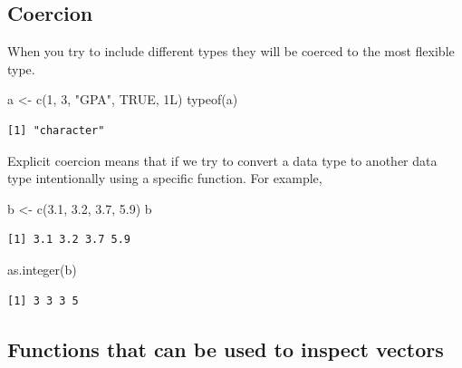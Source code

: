 \documentclass[
  letterpaper,
  DIV=11,
  numbers=noendperiod]{scrreprt}
\newenvironment{Shaded}{\begin{snugshade}}{\end{snugshade}}
\newcommand{\ConstantTok}[1]{\textcolor[rgb]{0.56,0.35,0.01}{#1}}
\newcommand{\DecValTok}[1]{\textcolor[rgb]{0.68,0.00,0.00}{#1}}
\newcommand{\FloatTok}[1]{\textcolor[rgb]{0.68,0.00,0.00}{#1}}
\newcommand{\FunctionTok}[1]{\textcolor[rgb]{0.28,0.35,0.67}{#1}}
\newcommand{\NormalTok}[1]{\textcolor[rgb]{0.00,0.23,0.31}{#1}}
\newcommand{\OtherTok}[1]{\textcolor[rgb]{0.00,0.23,0.31}{#1}}
\newcommand{\StringTok}[1]{\textcolor[rgb]{0.13,0.47,0.30}{#1}}
\begin{document}
\subsection{Coercion}\label{coercion}

When you try to include different types they will be coerced to the most
flexible type.

\begin{Shaded}
\begin{Highlighting}[]
\NormalTok{a }\OtherTok{\textless{}{-}} \FunctionTok{c}\NormalTok{(}\DecValTok{1}\NormalTok{, }\DecValTok{3}\NormalTok{, }\StringTok{"GPA"}\NormalTok{, }\ConstantTok{TRUE}\NormalTok{, }\DecValTok{1}\NormalTok{L)}
\FunctionTok{typeof}\NormalTok{(a)}
\end{Highlighting}
\end{Shaded}

\begin{verbatim}
[1] "character"
\end{verbatim}

Explicit coercion means that if we try to convert a data type to another
data type intentionally using a specific function. For example,

\begin{Shaded}
\begin{Highlighting}[]
\NormalTok{b }\OtherTok{\textless{}{-}} \FunctionTok{c}\NormalTok{(}\FloatTok{3.1}\NormalTok{, }\FloatTok{3.2}\NormalTok{, }\FloatTok{3.7}\NormalTok{, }\FloatTok{5.9}\NormalTok{)}
\NormalTok{b}
\end{Highlighting}
\end{Shaded}

\begin{verbatim}
[1] 3.1 3.2 3.7 5.9
\end{verbatim}

\begin{Shaded}
\begin{Highlighting}[]
\FunctionTok{as.integer}\NormalTok{(b)}
\end{Highlighting}
\end{Shaded}

\begin{verbatim}
[1] 3 3 3 5
\end{verbatim}

\subsection{Functions that can be used to inspect
vectors}\label{functions-that-can-be-used-to-inspect-vectors}
\end{document}
